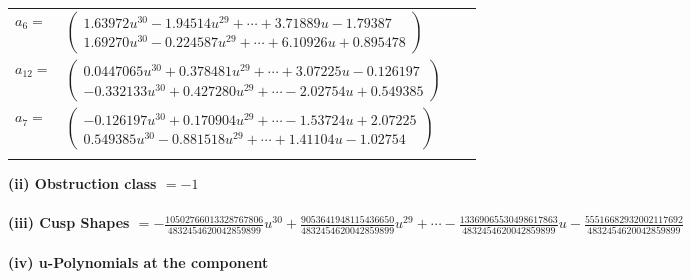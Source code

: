 \documentclass[1p]{elsarticle_modified}
\theoremstyle{definition}
\begin{document}
\begin{tabular}{m{7pt} m{180pt} m{7pt} m{180pt} }
\flushright $a_{6}=$&$\begin{pmatrix}1.63972 u^{30}-1.94514 u^{29}+\cdots+3.71889 u-1.79387\\1.69270 u^{30}-0.224587 u^{29}+\cdots+6.10926 u+0.895478\end{pmatrix}$ \\
\flushright $a_{12}=$&$\begin{pmatrix}0.0447065 u^{30}+0.378481 u^{29}+\cdots+3.07225 u-0.126197\\-0.332133 u^{30}+0.427280 u^{29}+\cdots-2.02754 u+0.549385\end{pmatrix}$ \\
\flushright $a_{7}=$&$\begin{pmatrix}-0.126197 u^{30}+0.170904 u^{29}+\cdots-1.53724 u+2.07225\\0.549385 u^{30}-0.881518 u^{29}+\cdots+1.41104 u-1.02754\end{pmatrix}$\\&\end{tabular}
\flushleft \textbf{(ii) Obstruction class $= -1$}\\~\\
\flushleft \textbf{(iii) Cusp Shapes $= -\frac{10502766013328767806}{4832454620042859899} u^{30}+\frac{9053641948115436650}{4832454620042859899} u^{29}+\cdots-\frac{13369065530498617863}{4832454620042859899} u-\frac{55516682932002117692}{4832454620042859899}$}\\~\\
\newpage\renewcommand{\arraystretch}{1}
\flushleft \textbf{(iv) u-Polynomials at the component}\newline \\
\end{document}
